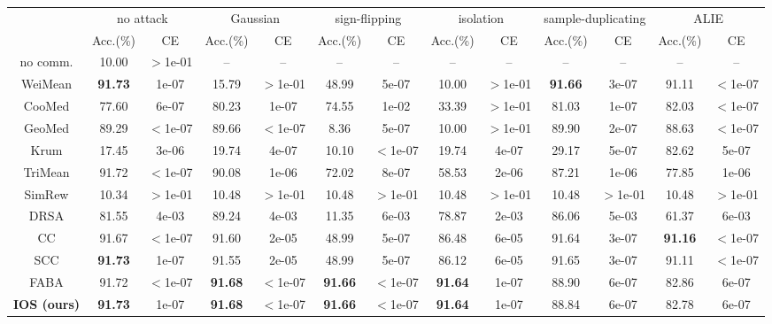 \begin{tabular}{c|cc|cc|cc|cc|cc|cc}
\hline\hline
\multirow{2}{*}{}&\multicolumn{2}{c|}{no attack}&\multicolumn{2}{c|}{Gaussian}&\multicolumn{2}{c|}{sign-flipping}&\multicolumn{2}{c|}{isolation}&\multicolumn{2}{c|}{sample-duplicating}&\multicolumn{2}{c}{ALIE}\\
& Acc.(\%) & CE & Acc.(\%) & CE & Acc.(\%) & CE & Acc.(\%) & CE & Acc.(\%) & CE & Acc.(\%) & CE \\
\hline
no comm. & 10.00 & $>$1e-01 & -- & --  & -- & --  & -- & --  & -- & --  & -- & -- \\
\hline
WeiMean & \textbf{91.73} & {1e-07} & {15.79} & {$>$1e-01} & {48.99} & {5e-07} & {10.00} & {$>$1e-01} & \textbf{91.66} & {3e-07} & {91.11} & {$<$1e-07}\\
CooMed & {77.60} & {6e-07} & {80.23} & {1e-07} & {74.55} & {1e-02} & {33.39} & {$>$1e-01} & {81.03} & {1e-07} & {82.03} & {$<$1e-07}\\
GeoMed & {89.29} & {$<$1e-07} & {89.66} & {$<$1e-07} & {8.36} & {5e-07} & {10.00} & {$>$1e-01} & {89.90} & {2e-07} & {88.63} & {$<$1e-07}\\
Krum & {17.45} & {3e-06} & {19.74} & {4e-07} & {10.10} & {$<$1e-07} & {19.74} & {4e-07} & {29.17} & {5e-07} & {82.62} & {5e-07}\\
TriMean & {91.72} & {$<$1e-07} & {90.08} & {1e-06} & {72.02} & {8e-07} & {58.53} & {2e-06} & {87.21} & {1e-06} & {77.85} & {1e-06}\\
SimRew & {10.34} & {$>$1e-01} & {10.48} & {$>$1e-01} & {10.48} & {$>$1e-01} & {10.48} & {$>$1e-01} & {10.48} & {$>$1e-01} & {10.48} & {$>$1e-01}\\
DRSA & {81.55} & {4e-03} & {89.24} & {4e-03} & {11.35} & {6e-03} & {78.87} & {2e-03} & {86.06} & {5e-03} & {61.37} & {6e-03}\\
CC & {91.67} & {$<$1e-07} & {91.60} & {2e-05} & {48.99} & {5e-07} & {86.48} & {6e-05} & {91.64} & {3e-07} & \textbf{91.16} & {$<$1e-07}\\
SCC & \textbf{91.73} & {1e-07} & {91.55} & {2e-05} & {48.99} & {5e-07} & {86.12} & {6e-05} & {91.65} & {3e-07} & {91.11} & {$<$1e-07}\\
FABA & {91.72} & {$<$1e-07} & \textbf{91.68} & {$<$1e-07} & \textbf{91.66} & {$<$1e-07} & \textbf{91.64} & {1e-07} & {88.90} & {6e-07} & {82.86} & {6e-07}\\
\textbf{IOS (ours)} & \textbf{91.73} & {1e-07} & \textbf{91.68} & {$<$1e-07} & \textbf{91.66} & {$<$1e-07} & \textbf{91.64} & {1e-07} & {88.84} & {6e-07} & {82.78} & {6e-07}\\
\hline\hline
\end{tabular}

